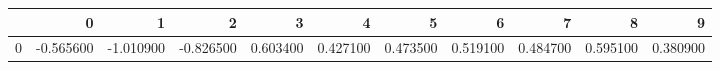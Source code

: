 \begin{tabular}{lrrrrrrrrrr}
\toprule
 & 0 & 1 & 2 & 3 & 4 & 5 & 6 & 7 & 8 & 9 \\
\midrule
0 & -0.565600 & -1.010900 & -0.826500 & 0.603400 & 0.427100 & 0.473500 & 0.519100 & 0.484700 & 0.595100 & 0.380900 \\
\bottomrule
\end{tabular}
